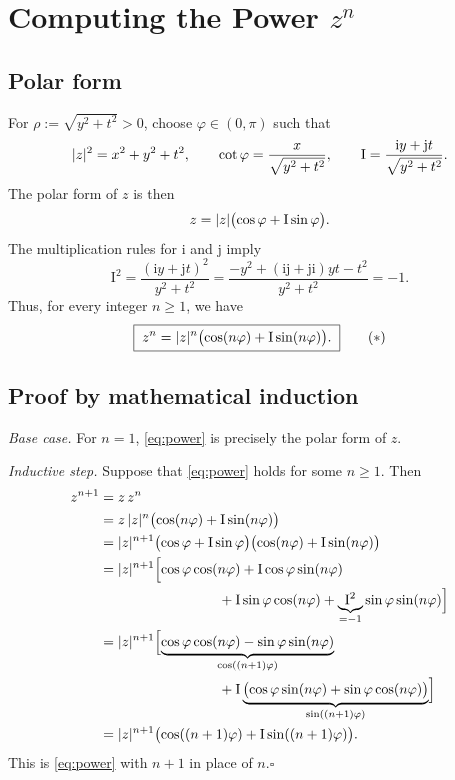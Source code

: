 \documentclass[11pt,a4paper]{article}
\newcommand{\ii}{\mathrm{i}}
\newcommand{\jj}{\mathrm{j}}
\newcommand{\I}{\mathrm{I}}
\DeclarePairedDelimiter{\abs}{\lvert}{\rvert}
\begin{document}
\newpage

\section*{Computing the Power \texorpdfstring{$z^n$}{z to the power n}}

\subsection*{Polar form}
For $\rho:=\sqrt{y^2+t^2}>0$, choose $\varphi\in(0,\pi)$ such that
\[
  \abs{z}^2=x^2+y^2+t^2,
  \qquad
  \cot\varphi=\frac{x}{\sqrt{y^2+t^2}},
  \qquad
  \I=\frac{\ii y+\jj t}{\sqrt{y^2+t^2}}.
\]
The polar form of $z$ is then
\[
  z=\abs{z}\bigl(\cos\varphi+\I\sin\varphi\bigr).
\]
The multiplication rules for $\ii$ and $\jj$ imply
\[
  \I^2
  =\frac{(\ii y+\jj t)^2}{y^2+t^2}
  =\frac{-y^2+(\ii\jj+\jj\ii)yt-t^2}{y^2+t^2}
  =-1.
\]
Thus, for every integer $n\geq 1$, we have
\begin{equation}
  \boxed{\;
    z^n=\abs{z}^{n}\bigl(\cos(n\varphi)+\I\sin(n\varphi)\bigr).
  \;}
  \tag{$*$}\label{eq:power}
\end{equation}

\subsection*{Proof by mathematical induction}
\textit{Base case.}
For $n=1$, \eqref{eq:power} is precisely the polar form of $z$.

\textit{Inductive step.}
Suppose that \eqref{eq:power} holds for some $n\geq 1$. Then
\begin{align*}
  z^{n+1}
    &=z\,z^n\\
    &=z\,\abs{z}^{n}\bigl(\cos(n\varphi)+\I\sin(n\varphi)\bigr)\\
    &=\abs{z}^{n+1}
      \bigl(\cos\varphi+\I\sin\varphi\bigr)
      \bigl(\cos(n\varphi)+\I\sin(n\varphi)\bigr)\\
    &=\abs{z}^{n+1}\Bigl[
      \cos\varphi\cos(n\varphi)
      +\I\cos\varphi\sin(n\varphi)\\
    &\hspace{30mm}
      +\I\sin\varphi\cos(n\varphi)
      +\underbrace{\I^2}_{=-1}\sin\varphi\sin(n\varphi)
      \Bigr]\\
    &=\abs{z}^{n+1}\Bigl[
      \underbrace{\cos\varphi\cos(n\varphi)
      -\sin\varphi\sin(n\varphi)}_{\cos((n+1)\varphi)}\\
    &\hspace{30mm}
      +\I\underbrace{\bigl(\cos\varphi\sin(n\varphi)
      +\sin\varphi\cos(n\varphi)\bigr)}_{\sin((n+1)\varphi)}
      \Bigr]\\
    &=\abs{z}^{n+1}
      \bigl(\cos((n+1)\varphi)+\I\sin((n+1)\varphi)\bigr).
\end{align*}
This is \eqref{eq:power} with $n+1$ in place of $n$.\hfill$\square$
\end{document}
